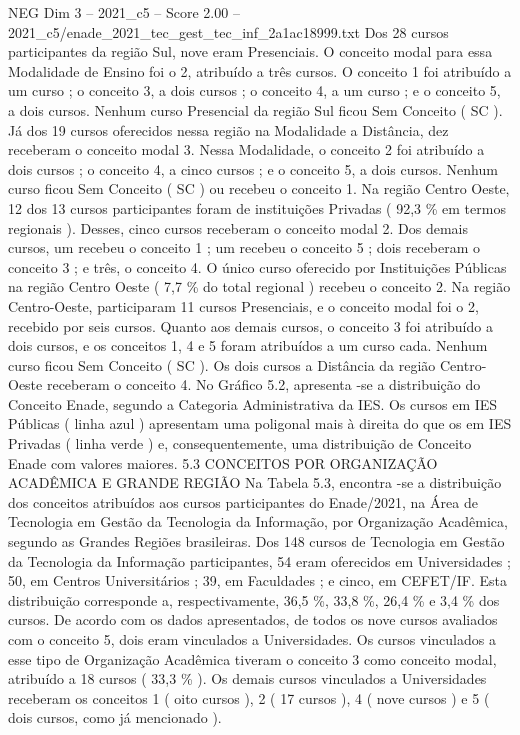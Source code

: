 \begin{textsample}{NEG Dim 3 – 2021\_c5 – Score 2.00 – 2021\_c5/enade\_2021\_tec\_gest\_tec\_inf\_2a1ac18999.txt}
Dos 28 cursos participantes da região Sul, nove eram Presenciais.
O conceito modal para essa Modalidade de Ensino foi o 2, atribuído a três cursos.
O conceito 1 foi atribuído a um curso ; o conceito 3, a dois cursos ; o conceito 4, a um curso ; e o conceito 5, a dois cursos.
Nenhum curso Presencial da região Sul ficou Sem Conceito ( SC ).
Já dos 19 cursos oferecidos nessa região na Modalidade a Distância, dez receberam o conceito modal 3.
Nessa Modalidade, o conceito 2 foi atribuído a dois cursos ; o conceito 4, a cinco cursos ; e o conceito 5, a dois cursos.
Nenhum curso ficou Sem Conceito ( SC ) ou recebeu o conceito 1.
Na região Centro Oeste, 12 dos 13 cursos participantes foram de instituições Privadas ( 92,3 \% em termos regionais ).
Desses, cinco cursos receberam o conceito modal 2.
Dos demais cursos, um recebeu o conceito 1 ; um recebeu o conceito 5 ; dois receberam o conceito 3 ; e três, o conceito 4.
O único curso oferecido por Instituições Públicas na região Centro Oeste ( 7,7 \% do total regional ) recebeu o conceito 2.
Na região Centro-Oeste, participaram 11 cursos Presenciais, e o conceito modal foi o 2, recebido por seis cursos.
Quanto aos demais cursos, o conceito 3 foi atribuído a dois cursos, e os conceitos 1, 4 e 5 foram atribuídos a um curso cada.
Nenhum curso ficou Sem Conceito ( SC ).
Os dois cursos a Distância da região Centro-Oeste receberam o conceito 4.
No Gráfico 5.2, apresenta -se a distribuição do Conceito Enade, segundo a Categoria Administrativa da IES.
Os cursos em IES Públicas ( linha azul ) apresentam uma poligonal mais à direita do que os em IES Privadas ( linha verde ) e, consequentemente, uma distribuição de Conceito Enade com valores maiores. 5.3 CONCEITOS POR ORGANIZAÇÃO ACADÊMICA E GRANDE REGIÃO Na Tabela 5.3, encontra -se a distribuição dos conceitos atribuídos aos cursos participantes do Enade/2021, na Área de Tecnologia em Gestão da Tecnologia da Informação, por Organização Acadêmica, segundo as Grandes Regiões brasileiras.
Dos 148 cursos de Tecnologia em Gestão da Tecnologia da Informação participantes, 54 eram oferecidos em Universidades ; 50, em Centros Universitários ; 39, em Faculdades ; e cinco, em CEFET/IF.
Esta distribuição corresponde a, respectivamente, 36,5 \%, 33,8 \%, 26,4 \% e 3,4 \% dos cursos.
De acordo com os dados apresentados, de todos os nove cursos avaliados com o conceito 5, dois eram vinculados a Universidades.
Os cursos vinculados a esse tipo de Organização Acadêmica tiveram o conceito 3 como conceito modal, atribuído a 18 cursos ( 33,3 \% ).
Os demais cursos vinculados a Universidades receberam os conceitos 1 ( oito cursos ), 2 ( 17 cursos ), 4 ( nove cursos ) e 5 ( dois cursos, como já mencionado ).

\end{textsample}
